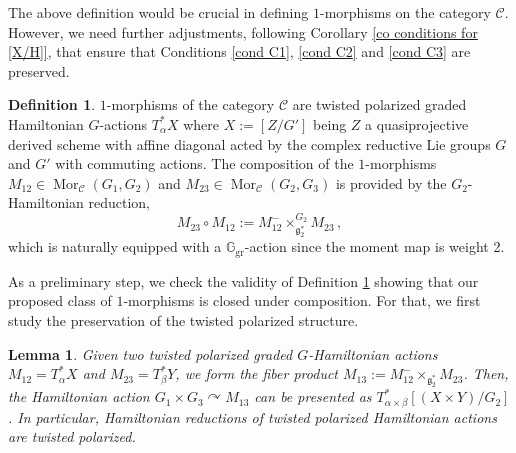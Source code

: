 \documentclass[11pt, a4paper]{amsart}
\numberwithin{equation}{section}
\newtheorem{lemma}[theorem]{Lemma}
\theoremstyle{definition}
\newtheorem{definition}[theorem]{Definition}
\theoremstyle{remark}
\DeclareMathOperator{\Mor}{Mor}
\newcommand{\Cc}{\mathcal{C}}
\newcommand{\Ggr}{\mathbb{G}_{\mathrm{gr}}}
\newcommand{\acts}{\curvearrowright}
\begin{document}
The above definition would be crucial in defining $1$-morphisms on the category $\Cc$. However, we need further adjustments, following Corollary \ref{co conditions for [X/H]}, that ensure that Conditions \ref{cond C1}, \ref{cond C2} and \ref{cond C3} are preserved.


\begin{definition}\label{defn 1-morphism}
$1$-morphisms of the category $\Cc$ are twisted polarized graded Hamiltonian $G$-actions $T_\alpha^*X$ where $X := [Z/G']$ being $Z$ a quasiprojective derived scheme with affine diagonal acted by the complex reductive Lie groups $G$ and $G'$ with commuting actions. The composition of the $1$-morphisms $M_{12} \in \Mor_{\Cc}(G_1, G_2)$ and $M_{23} \in \Mor_{\Cc}(G_2, G_3)$ is provided by the $G_2$-Hamiltonian reduction, 
\[
M_{23} \circ M_{12} :=  M_{12}^- \times_{\mathfrak{g}_2^*}^{G_2} M_{23} \,,
\]
which is naturally equipped with a $\Ggr$-action since the moment map is weight 2.
\end{definition}

As a preliminary step, we check the validity of Definition \ref{defn 1-morphism} showing that our proposed class of $1$-morphisms is closed under composition. For that, we first study the preservation of the twisted polarized structure.

\begin{lemma} \label{lemma composition of twisted polarization}
Given two twisted polarized graded $G$-Hamiltonian actions $M_{12} = T^*_\alpha X$ and $M_{23} = T^*_\beta Y$, we form the fiber product $M_{13} := M_{12}^- \times_{\mathfrak{g}_2^*} M_{23}$. Then, the Hamiltonian action $G_1 \times G_3 \acts M_{13}$ can be presented as $T^*_{\alpha \times \beta}[(X \times Y)/G_2]$. In particular, Hamiltonian reductions of twisted polarized Hamiltonian actions are twisted polarized.
\end{lemma}
\end{document}
